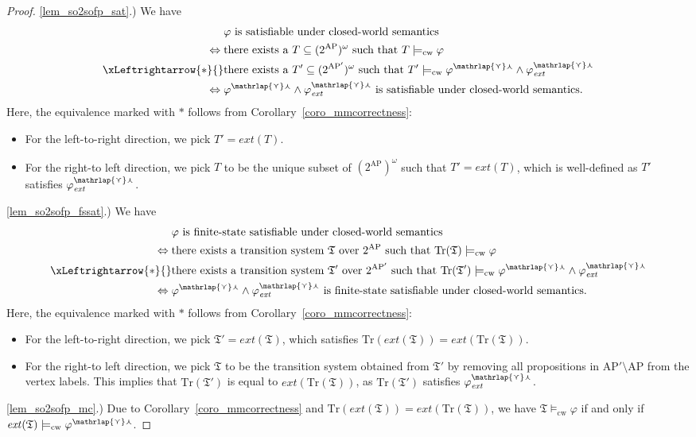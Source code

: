 \documentclass[dvipsnames,10pt,a4paper]{amsart}
\theoremstyle{definition}
\theoremstyle{remark}
\renewcommand{\phi}{\varphi}
\newcommand{\pow}[1]{2^{#1}}
\newcommand{\ap}[0]{\mathrm{AP}}
\newcommand{\smalar}{{\mathrlap{\curlyvee}\curlywedge}}
\newcommand{\tsys}{\mathfrak{T}}
\newcommand{\traces}{\mathrm{Tr}}
\newcommand{\cw}{\mathrm{cw}}
\newcommand{\extend}{\mathit{ext}}
\begin{document}
\begin{proof}
\ref{lem_so2sofp_sat}.) 
We have
\begin{align*}
{}&{} \text{$\phi$ is satisfiable under closed-world semantics}\\
\Leftrightarrow {}&{} \text{there exists a $T \subseteq (\pow{\ap})^\omega$ such that $ T \models_\cw \phi$}\\
\xLeftrightarrow{\ast} {}&{} \text{there exists a $T' \subseteq (\pow{\ap'})^\omega$ such that $ T' \models_\cw \phi^{\smalar}\wedge \phi_\extend^{\smalar}$}\\
\Leftrightarrow {}&{} \text{$\phi^{\smalar} \wedge \phi_\extend^{\smalar}$ is satisfiable under closed-world semantics.}
\end{align*}
Here, the equivalence marked with $\ast$ follows from Corollary~\ref{coro_mmcorrectness}:
\begin{itemize}
    \item For the left-to-right direction, we pick $T' = \extend(T)$. 
    \item For the right-to left direction, we pick $T$ to be the unique subset of $(\pow{\ap})^\omega$ such that $T' = \extend(T)$, which is well-defined as $T'$ satisfies $\phi_\extend^{\smalar}$. 
\end{itemize}

\ref{lem_so2sofp_fssat}.)
We have
\begin{align*}
{}&{} \text{$\phi$ is finite-state satisfiable under closed-world semantics}\\
\Leftrightarrow {}&{} \text{there exists a transition system~$\tsys$ over $\pow{\ap}$ such that $\traces(\tsys) \models_\cw \phi$}\\
\xLeftrightarrow{\ast} {}&{} \text{there exists a transition system~$\tsys'$ over $\pow{\ap'}$ such that $\traces(\tsys') \models_\cw \phi^{\smalar}\wedge \phi_\extend^{\smalar}$}\\
\Leftrightarrow {}&{} \text{$\phi^{\smalar} \wedge \phi_\extend^{\smalar}$ is finite-state satisfiable under closed-world semantics.}
\end{align*}
Here, the equivalence marked with $\ast$ follows from Corollary~\ref{coro_mmcorrectness}:
\begin{itemize}
    \item For the left-to-right direction, we pick $\tsys' = \extend(\tsys)$, which satisfies $\traces(\extend(\tsys)) = \extend(\traces(\tsys))$.
    \item For the right-to left direction, we pick $\tsys$ to be the transition system obtained from $\tsys'$ by removing all propositions in $\ap' \setminus \ap$ from the vertex labels.
    This implies that $\traces(\tsys')$ is equal to $\extend(\traces(\tsys))$, as $\traces(\tsys')$ satisfies $\phi_\extend^{\smalar}$.
\end{itemize}

\ref{lem_so2sofp_mc}.) 
Due to Corollary~\ref{coro_mmcorrectness} and $\traces(\extend(\tsys)) = \extend(\traces(\tsys))$, we have $\tsys \models_\cw \phi$ if and only if $\extend(\tsys)\models_\cw \phi^\smalar$.
\end{proof}
\end{document}
